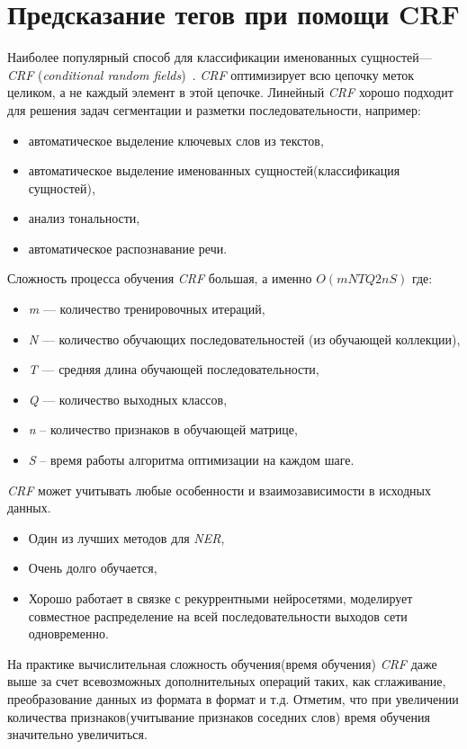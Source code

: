 \documentclass{csmathnotes}
\begin{document}
\section*{Предсказание тегов при помощи CRF}
Наиболее  популярный способ для классификации именованных сущностей— \emph{CRF} (\emph{conditional random fields})~\cite{HabrCRF}. \emph{CRF} оптимизирует всю цепочку меток целиком, а не каждый элемент в этой цепочке.  Линейный \emph{CRF} хорошо подходит для решения задач сегментации и разметки последовательности, например:
\begin{itemize}
	\item автоматическое выделение ключевых слов из текстов,
	\item автоматическое выделение именованных сущностей(классификация сущностей),
	\item анализ тональности,
	\item автоматическое распознавание речи.
\end{itemize}


Сложность процесса обучения \emph{CRF} большая, а именно $O(mNTQ2nS)$ где:
\begin{itemize}
	\item \emph{m} — количество тренировочных итераций,
	\item \emph{N} — количество обучающих последовательностей (из обучающей коллекции),
	\item \emph{T} — средняя длина обучающей последовательности,
	\item \emph{Q} — количество выходных классов,
	\item \emph{n} – количество признаков в обучающей матрице,
	\item \emph{S} – время работы алгоритма оптимизации на каждом шаге. 
\end{itemize}


\emph{CRF} может учитывать любые особенности и взаимозависимости в исходных данных.
\begin{itemize}
	\item Один из лучших методов для \emph{NER},
	\item Очень долго обучается,
	\item Хорошо работает в связке с рекуррентными нейросетями, моделирует совместное распределение на всей последовательности выходов сети одновременно.
\end{itemize}

На практике вычислительная сложность обучения(время обучения) \emph{CRF} даже выше за счет всевозможных дополнительных операций таких, как сглаживание, преобразование данных из формата в формат и т.д. Отметим, что при увеличении количества признаков(учитывание признаков соседних слов) время обучения значительно увеличиться. 
\end{document}
